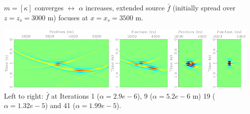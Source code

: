 \documentclass[xcolor=dvipsnames,12pt,aspectratio=169]{beamer}
\newcommand{\of}{\bar{f}}
\begin{document}
\begin{frame}
$m=[\kappa]$ converges $\leftrightarrow$ $\alpha$ increases, extended source $\of$ (initially spread over $z=z_s=3000$ m) {\color{blue} focuses} at $x=x_s=3500$ m.
\begin{center}
\hspace{-1cm}\includegraphics[height=1.25in]{Fig/cgw0_est_source_plh0.pdf}\includegraphics[height=1.25in]{Fig/cgw8_est_source_plh0.pdf}\includegraphics[height=1.25in]{Fig/cgw18_est_source_plh0.pdf}\includegraphics[height=1.25in]{Fig/cgw40_est_source_plh0.pdf}\\
\vspace{0.25in}
Left to right: $\of$ at Iterations 1 ($\alpha=2.9 e-6$), 9
($\alpha= 5.2 e-6$ m) 19 ($\alpha=1.32 e-5$) and 41 ($\alpha=1.99e-5$).
\end{center}
\end{frame}
\end{document}
